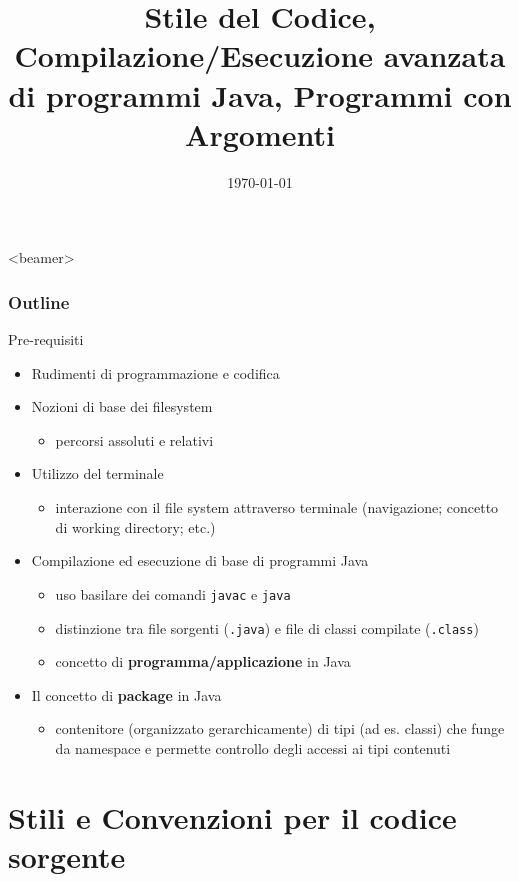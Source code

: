 \documentclass[xcolor=dvipsnames,presentation]{beamer}
\title[{\lab} -- Strumenti Avanzati]{Stile del Codice, Compilazione/Esecuzione avanzata di programmi Java, Programmi con Argomenti}
\date[\today]{\today}
\begin{document}
\frame[label=coverpage]{\titlepage}

\begin{frame}<beamer>
    \frametitle{Outline}
    \tableofcontents[]
\end{frame}

\begin{frame}{Pre-requisiti}
\begin{itemize}
\item Rudimenti di programmazione e codifica
\item Nozioni di base dei filesystem
    \begin{itemize}
    \item percorsi assoluti e relativi
    \end{itemize}
\item Utilizzo del terminale
    \begin{itemize}
    \item interazione con il file system attraverso terminale (navigazione; concetto di working directory; etc.)
    \end{itemize}
\item Compilazione ed esecuzione di base di programmi Java
    \begin{itemize}
    \item uso basilare dei comandi \texttt{javac} e \texttt{java}
    \item distinzione tra file sorgenti (\texttt{.java}) e file di classi compilate (\texttt{.class})
    \item concetto di \textbf{programma/applicazione} in Java
    \end{itemize}
\item Il concetto di \textbf{package} in Java
    \begin{itemize}
    \item contenitore (organizzato gerarchicamente) di tipi (ad es. classi) che funge da namespace e permette controllo degli accessi ai tipi contenuti
    \end{itemize}
\end{itemize}
\end{frame}

\section{Stili e Convenzioni per il codice sorgente}
\end{document}

